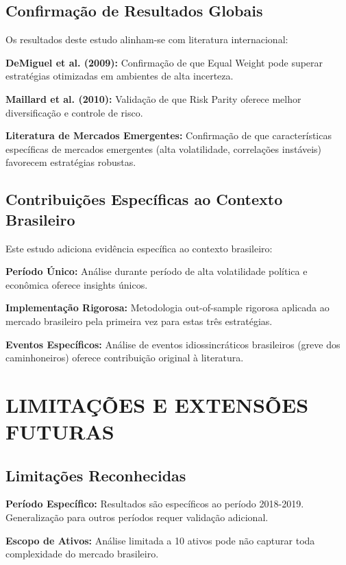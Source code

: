 \subsection{Confirmação de Resultados Globais}

Os resultados deste estudo alinham-se com literatura internacional:

\textbf{DeMiguel et al. (2009):} Confirmação de que Equal Weight pode superar estratégias otimizadas em ambientes de alta incerteza.

\textbf{Maillard et al. (2010):} Validação de que Risk Parity oferece melhor diversificação e controle de risco.

\textbf{Literatura de Mercados Emergentes:} Confirmação de que características específicas de mercados emergentes (alta volatilidade, correlações instáveis) favorecem estratégias robustas.

\subsection{Contribuições Específicas ao Contexto Brasileiro}

Este estudo adiciona evidência específica ao contexto brasileiro:

\textbf{Período Único:} Análise durante período de alta volatilidade política e econômica oferece insights únicos.

\textbf{Implementação Rigorosa:} Metodologia out-of-sample rigorosa aplicada ao mercado brasileiro pela primeira vez para estas três estratégias.

\textbf{Eventos Específicos:} Análise de eventos idiossincráticos brasileiros (greve dos caminhoneiros) oferece contribuição original à literatura.

\section{LIMITAÇÕES E EXTENSÕES FUTURAS}

\subsection{Limitações Reconhecidas}

\textbf{Período Específico:} Resultados são específicos ao período 2018-2019. Generalização para outros períodos requer validação adicional.

\textbf{Escopo de Ativos:} Análise limitada a 10 ativos pode não capturar toda complexidade do mercado brasileiro.

